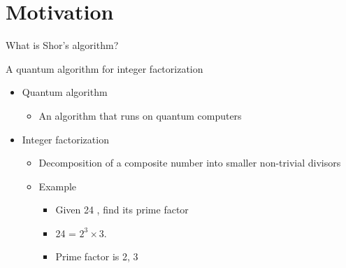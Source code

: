 \section{Motivation}\label{motivation}

\begin{frame}{What is Shor's algorithm?}

\begin{block}{A quantum algorithm for integer factorization}

\begin{itemize}
\item
  Quantum algorithm

  \begin{itemize}
  \itemsep1pt\parskip0pt
  \item
    An algorithm that runs on quantum computers
  \end{itemize}
\item
  Integer factorization

  \begin{itemize}
  \item
    Decomposition of a composite number into smaller non-trivial
    divisors
  \item
    Example

    \begin{itemize}
    \itemsep1pt\parskip0pt
    \item
      Given 24 , find its prime factor
    \item
      24 = $2^{3}\times 3$.
    \item
      Prime factor is 2, 3
    \end{itemize}
  \end{itemize}
\end{itemize}

\end{block}

\end{frame}

